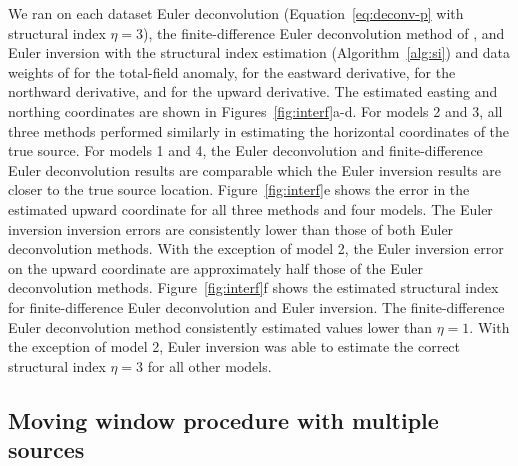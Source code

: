 We ran on each dataset Euler deconvolution (Equation~\ref{eq:deconv-p} with structural index $\eta=3$), the finite-difference Euler deconvolution method of \citet{Gerovska2005}, and Euler inversion with the structural index estimation (Algorithm~\ref{alg:si}) and data weights of \DefaultWeightsF{} for the total-field anomaly, \DefaultWeightsE{} for the eastward derivative, \DefaultWeightsN{} for the northward derivative, and \DefaultWeightsU{} for the upward derivative.
The estimated easting and northing coordinates are shown in Figures~\ref{fig:interf}a-d.
For models 2 and 3, all three methods performed similarly in estimating the horizontal coordinates of the true source. 
For models 1 and 4, the Euler deconvolution and finite-difference Euler deconvolution results are comparable which the Euler inversion results are closer to the true source location.
Figure~\ref{fig:interf}e shows the error in the estimated upward coordinate for all three methods and four models. 
The Euler inversion inversion errors are consistently lower than those of both Euler deconvolution methods.
With the exception of model 2, the Euler inversion error on the upward coordinate are approximately half those of the Euler deconvolution methods.
Figure~\ref{fig:interf}f shows the estimated structural index for finite-difference Euler deconvolution and Euler inversion.
The finite-difference Euler deconvolution method consistently estimated values lower than $\eta=1$.
With the exception of model 2, Euler inversion was able to estimate the correct structural index $\eta=3$ for all other models.


\subsection{Moving window procedure with multiple sources}
\label{sec:windows}

